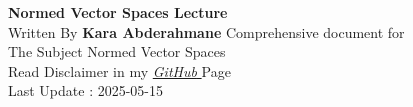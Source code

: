 \documentclass{report}
\begin{document}
\begin{titlepage}
   \begin{center}
       \vspace*{1cm}
       \textbf{Normed Vector Spaces Lecture} \\
       \vspace{0.5cm} 
       Written By \textbf{Kara Abderahmane}
       \vspace{1.5cm}
       \vfill
       Comprehensive document for \\
       The Subject Normed Vector Spaces \\
       Read Disclaimer in my 
       \href{https://github.com/Kapa9102/nvs-lecture}{\it GitHub \normalfont}  Page  \\
       \vspace{0.8cm}
       Last Update : 2025-05-15
   \end{center}
\end{titlepage}

\tableofcontents
























\end{document}
